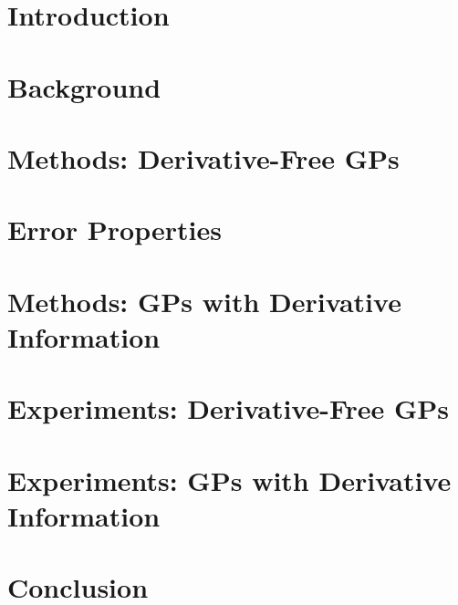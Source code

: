 



\section{Introduction}\label{sgpsec:int}
	

\section{Background}\label{sgpsec:bac}
	

\section{Methods: Derivative-Free GPs}\label{sgpsec:met}
	

\section{Error Properties}\label{sgpsec:err}
	

\section{Methods: GPs with Derivative Information}\label{sgpsec:dmet}
	

\section{Experiments: Derivative-Free GPs}\label{sgpsec:exp}
	

\section{Experiments: GPs with Derivative Information}\label{sgpsec:dexp}
	

\section{Conclusion}\label{sgpsec:con}
	